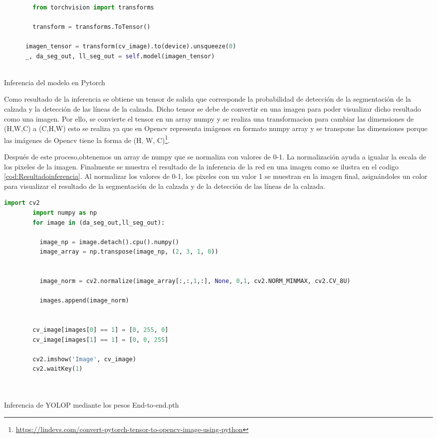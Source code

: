     \begin{code}[h]
      \begin{lstlisting}[language=Python]
     
        from torchvision import transforms

        transform = transforms.ToTensor() 
                    
      imagen_tensor = transform(cv_image).to(device).unsqueeze(0)
      _, da_seg_out, ll_seg_out = self.model(imagen_tensor)
    
      \end{lstlisting}
      \caption[Inferencia del modelo]{Inferencia del modelo en Pytorch}
      \label{cod:Inferencia}
      \end{code}  

    Como resultado de la inferencia se obtiene un tensor de salida que corresponde la probabilidad de detección de la segmentación
    de la calzada y la detección de las líneas de la calzada. Dicho tensor se debe de convertir en una imagen para poder visualizar
    dicho resultado como una imagen. 
    Por ello, se convierte el tensor en un array numpy y se realiza una transformacion para cambiar las dimensiones de (H,W,C) 
    a (C,H,W) esto se realiza ya que en Opencv representa imágenes en formato numpy array y se transpone las dimensiones porque las
    imágenes de Opencv tiene la forma de (H, W, C)\footnote{\url{https://lindevs.com/convert-pytorch-tensor-to-opencv-image-using-python}}. 

    Después de este proceso,obtenemos un array de numpy que se normaliza con valores de 0-1. La normalización 
    ayuda a igualar la escala de los pixeles de la imagen. Finalmente se muestra el resultado de la inferencia de la red 
    en una imagen como se ilustra en el codigo \ref{cod:Resultadoinferencia}. Al normalizar los valores de 0-1, los pixeles con un valor 1 se muestran en la imagen final, asignándoles un color
    para visualizar el resultado de la segmentación de la calzada y de la detección de las líneas de la calzada. \newline
    \newpage
    \begin{code}[h]
      \begin{lstlisting}[language=Python]
        import cv2
        import numpy as np
        for image in (da_seg_out,ll_seg_out):

          image_np = image.detach().cpu().numpy()
          image_array = np.transpose(image_np, (2, 3, 1, 0))

        
          image_norm = cv2.normalize(image_array[:,:,1,:], None, 0,1, cv2.NORM_MINMAX, cv2.CV_8U)

          images.append(image_norm)

    
        cv_image[images[0] == 1] = [0, 255, 0]
        cv_image[images[1] == 1] = [0, 0, 255]

        cv2.imshow('Image', cv_image)
        cv2.waitKey(1)

    
      \end{lstlisting}
      \caption[Resultado de la inferencia del modelo YOLOP]{Inferencia de YOLOP mediante los pesos End-to-end.pth}
      \label{cod:Resultadoinferencia}
      \end{code}  


